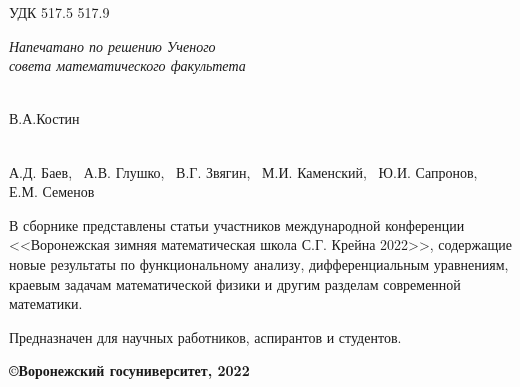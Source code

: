 \noindent УДК 517.5 517.9

\begin{flushright}
{\it Напечатано по решению Ученого \\ совета математического
факультета \\
}
 \end{flushright}
\vspace{15mm}{\bf Материалы работы международной конференции
\\<<Воронежская зимняя математическая школа С.Г.
Крейна - 2022>>. Воронеж: ВГУ, 2022 - с.}

\vspace{5mm}

 \\
В.А.Костин

\vspace{5mm}

 \\
А.Д. Баев, \  А.В. Глушко, \ В.Г. Звягин, \ М.И. Каменский, \ Ю.И. Сапронов, \\
Е.М. Семенов

\vspace{15mm}

В сборнике представлены статьи участников международной конференции
\\
<<Воронежская зимняя математическая школа С.Г. Крейна 2022>>,
содержащие новые
результаты по функциональному анализу, дифференциальным уравнениям,
краевым задачам математической физики и другим разделам современной
математики.

Предназначен для научных работников, аспирантов и студентов.


\begin{flushright}
{\bf \copyright Воронежский госуниверситет, 2022}
\end{flushright}

\newpage
